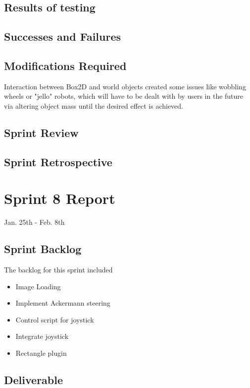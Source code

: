 \subsection{Results of testing}


\subsection{Successes and Failures}


\subsection{Modifications Required}
Interaction between Box2D and world objects created some issues like wobbling wheels or "jello" robots, which will have to be dealt with by users in the future via altering object mass until the desired effect is achieved.

\subsection{Sprint Review}


\subsection{Sprint Retrospective}
 \section{Sprint 8 Report}
Jan. 25th - Feb. 8th
\subsection{Sprint Backlog}

The backlog for this sprint included 

\begin{itemize}
	\item Image Loading
	\item Implement Ackermann steering
	\item Control script for joystick
	\item Integrate joystick
	\item Rectangle plugin
\end{itemize}

\subsection{Deliverable}

